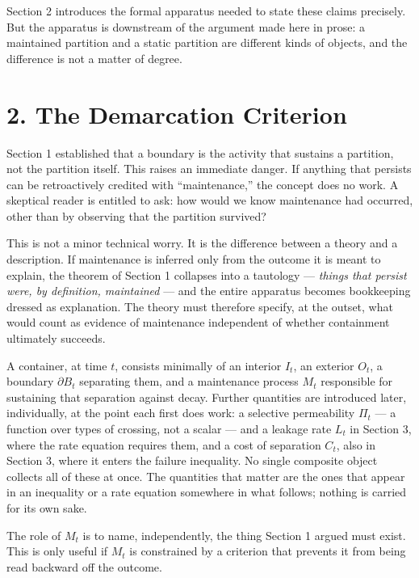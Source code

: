 \documentclass[11pt]{article}
\theoremstyle{plain}
\begin{document}
Section 2 introduces the formal apparatus needed to state these claims precisely. But the apparatus is downstream of the argument made here in prose: a maintained partition and a static partition are different kinds of objects, and the difference is not a matter of degree.

\section*{2. The Demarcation Criterion}

Section 1 established that a boundary is the activity that sustains a partition, not the partition itself. This raises an immediate danger. If anything that persists can be retroactively credited with ``maintenance,'' the concept does no work. A skeptical reader is entitled to ask: how would we know maintenance had occurred, other than by observing that the partition survived?

This is not a minor technical worry. It is the difference between a theory and a description. If maintenance is inferred only from the outcome it is meant to explain, the theorem of Section 1 collapses into a tautology --- \emph{things that persist were, by definition, maintained} --- and the entire apparatus becomes bookkeeping dressed as explanation. The theory must therefore specify, at the outset, what would count as evidence of maintenance independent of whether containment ultimately succeeds.

A container, at time \(t\), consists minimally of an interior \(I_t\), an exterior \(O_t\), a boundary \(\partial B_t\) separating them, and a maintenance process \(M_t\) responsible for sustaining that separation against decay. Further quantities are introduced later, individually, at the point each first does work: a selective permeability \(\Pi_t\) --- a function over types of crossing, not a scalar --- and a leakage rate \(L_t\) in Section 3, where the rate equation requires them, and a cost of separation \(C_t\), also in Section 3, where it enters the failure inequality. No single composite object collects all of these at once. The quantities that matter are the ones that appear in an inequality or a rate equation somewhere in what follows; nothing is carried for its own sake.

The role of \(M_t\) is to name, independently, the thing Section 1 argued must exist. This is only useful if \(M_t\) is constrained by a criterion that prevents it from being read backward off the outcome.
\end{document}
